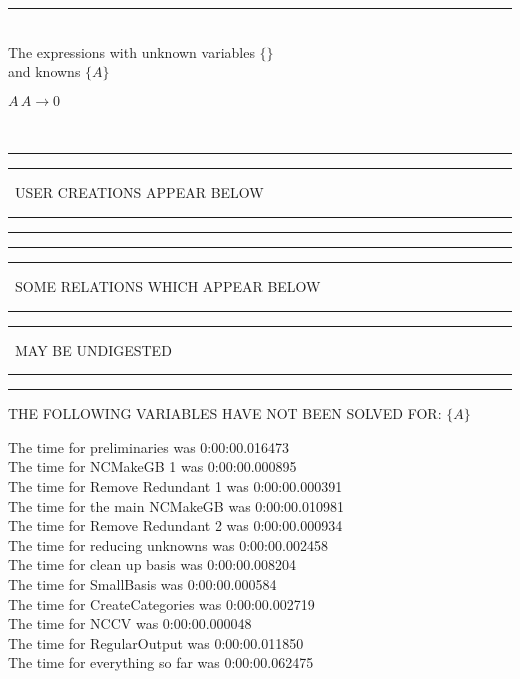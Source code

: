 \documentclass[rep10,leqno]{report}
\begin{document}
\rule[3pt]{6in}{.7pt}\\
The expressions with unknown variables $\{\}$\\
and knowns $\{A\}$\smallskip\\
\begin{minipage}{6in}
$
A\,
 A\rightarrow 0
$
\end{minipage}\\
\rule[2pt]{6in}{1pt}\hfil\break
\rule[2.5pt]{1.701in}{1pt}
\ USER CREATIONS APPEAR BELOW\ 
\rule[2.5pt]{1.701in}{1pt}\hfil\break
\rule[2pt]{6in}{1pt}\hfil\break
\rule[2pt]{6in}{4pt}\hfil\break
\rule[2pt]{1.45in}{4pt}
\ SOME RELATIONS WHICH APPEAR BELOW\ 
\rule[2pt]{1.45in}{4pt}\hfil\break
\rule[2pt]{2.18in}{4pt}
\ MAY BE UNDIGESTED\ 
\rule[2pt]{2.18in}{4pt}\hfil\break
\rule[2pt]{6in}{4pt}\hfil\break
THE FOLLOWING VARIABLES HAVE NOT BEEN SOLVED FOR:\hfil\break
$\{A\}$
\smallskip\\
\vspace{10pt}

\noindent
The time for preliminaries was 0:00:00.016473\\
The time for NCMakeGB 1 was 0:00:00.000895\\
The time for Remove Redundant 1 was 0:00:00.000391\\
The time for the main NCMakeGB was 0:00:00.010981\\
The time for Remove Redundant 2 was 0:00:00.000934\\
The time for reducing unknowns was 0:00:00.002458\\
The time for clean up basis was 0:00:00.008204\\
The time for SmallBasis was 0:00:00.000584\\
The time for CreateCategories was 0:00:00.002719\\
The time for NCCV was 0:00:00.000048\\
The time for RegularOutput was 0:00:00.011850\\
The time for everything so far was 0:00:00.062475\\
\end{document}
